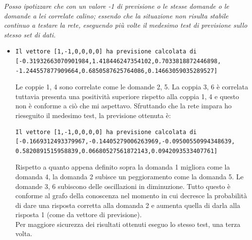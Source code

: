 \noindent
\textit{Posso ipotizzare che con un valore -1 di previsione o le stesse domande o le domande a lei correlate calino; essendo che la situazione non risulta stabile continuo a testare la rete, eseguendo pi\`u volte il medesimo test di previsione sullo stesso set di dati.}

\begin{itemize}

\item \begin{verbatim}
Il vettore [1,-1,0,0,0,0] ha previsione calcolata di
[-0.31932663070901984,1.418446247354102,0.7033818872446898,
-1.244557877909664,0.6850587625764086,0.14663059035289527]
\end{verbatim}
Le coppie 1, 4 sono correlate come le domande 2, 5. La coppia 3, 6 \`e correlata tuttavia presenta una positivit\`a superiore rispetto alla coppia 1, 4 e questo non \`e conforme a ci\`o che mi aspettavo.
Sfruttando che la rete impara ho rieseguito il medesimo test, la previsione ottenuta \`e:
\begin{verbatim}Il vettore [1,-1,0,0,0,0] ha previsione calcolata di
[-0.1669312493379967,-0.14405279006263969,-0.09500550994348639,
0.5820891515958839,0.06680527561872143,0.0942093533407761]
\end{verbatim}
Rispetto a quanto appena definito sopra la domanda 1 migliora come la domanda 4, la domanda 2 subisce un peggioramento come la domanda 5.  Le domande 3, 6 subiscono delle oscillazioni in diminuzione. Tutto questo \`e conforme al grafo della conoscenza nel momento in cui decresce la probabilit\`a di dare una risposta corretta alla domanda 2 e aumenta quella di darla alla risposta 1 (come da vettore di previsione).\\
Per maggiore sicurezza dei risultati ottenuti eseguo lo stesso test, una terza volta.


\end{itemize}
